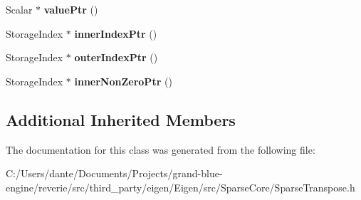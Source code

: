 \begin{DoxyCompactItemize}
Scalar $\ast$ {\bfseries value\+Ptr} ()
\item 
\mbox{\label{class_eigen_1_1internal_1_1_sparse_transpose_impl_3_01_matrix_type_00_01_compressed_access_bit_01_4_ac0f0628eaedfd590e5c14771f6d46131}} 
Storage\+Index $\ast$ {\bfseries inner\+Index\+Ptr} ()
\item 
\mbox{\label{class_eigen_1_1internal_1_1_sparse_transpose_impl_3_01_matrix_type_00_01_compressed_access_bit_01_4_ad1b7889c71608d502c2effb9b171834d}} 
Storage\+Index $\ast$ {\bfseries outer\+Index\+Ptr} ()
\item 
\mbox{\label{class_eigen_1_1internal_1_1_sparse_transpose_impl_3_01_matrix_type_00_01_compressed_access_bit_01_4_ab5057fbf13b8241b6992de725c726e64}} 
Storage\+Index $\ast$ {\bfseries inner\+Non\+Zero\+Ptr} ()
\end{DoxyCompactItemize}
\subsection*{Additional Inherited Members}


The documentation for this class was generated from the following file\+:\begin{DoxyCompactItemize}
\item 
C\+:/\+Users/dante/\+Documents/\+Projects/grand-\/blue-\/engine/reverie/src/third\+\_\+party/eigen/\+Eigen/src/\+Sparse\+Core/Sparse\+Transpose.\+h\end{DoxyCompactItemize}
